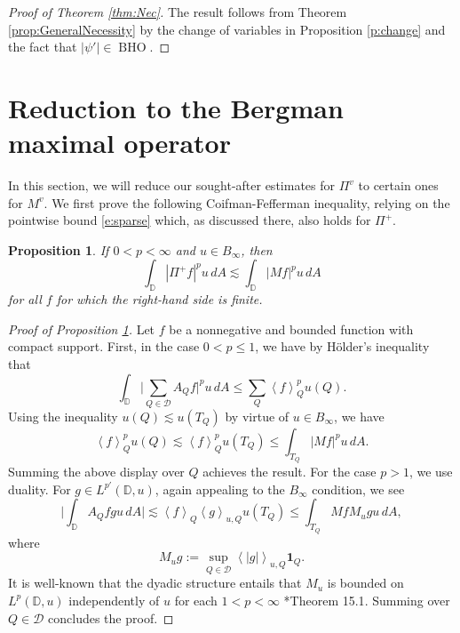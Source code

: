 \documentclass{amsart}
\newcommand{\abs}[1]{\left\vert {#1}\right\vert}
\newcommand{\avg}[1]{\left\langle {#1}\right\rangle}
\newtheorem{proposition}[theorem]{Proposition}
\theoremstyle{definition}
\numberwithin{equation}{section}
\newcommand{\Piv}{\Pi^v}
\newcommand{\Mv}{M^v}
\DeclareMathOperator{\BHO}{BHO}
\begin{document}
\begin{proof}[Proof of Theorem \ref{thm:Nec}]
The result follows from Theorem \ref{prop:GeneralNecessity} by the change of variables in Proposition \ref{p:change}
and the fact that $|\psi'| \in \BHO$. 
\end{proof}




\section{Reduction to the Bergman maximal operator}\label{s:Reduction}

In this section, we will reduce our sought-after estimates for $\Piv$ to certain ones for $\Mv$. We first prove the following Coifman-Fefferman inequality, relying on the pointwise bound \eqref{e:sparse} which, as discussed there, also holds for $\Pi^+$. 


\begin{proposition}\label{p:CF}
If $0<p<\infty$ and $u \in B_\infty$, then 
\[
    \int_{\mathbb{D}} |\Pi^+ f|^p u \, dA \lesssim \int_{\mathbb{D}} |Mf|^p u \, dA
\]
for all $f$ for which the right-hand side is finite.
\end{proposition}

\begin{proof}[Proof of Proposition \ref{p:CF}]
Let $f$ be a nonnegative and bounded function with compact support. First, in the case $0<p\leq 1$, we have by H\"older's inequality that
	\[ \int_{\mathbb D} \Big|\sum_{Q \in \mathcal D} A_Q f\Big|^p u \, dA \le \sum_Q \avg{f}_Q^p u(Q). \]
Using the inequality $u(Q) \lesssim u(T_Q)$ by virtue of $u \in B_\infty$, we have
	\[ \avg{f}_Q^p u(Q) \lesssim \avg{f}_Q^p u(T_Q) \le \int_{T_Q} \abs{Mf}^p u \, dA.\]
Summing the above display over $Q$ achieves the result. 
For the case $p>1$, we use duality. For $g \in L^{p'}(\mathbb{D},u)$, again appealing to the $B_{\infty}$ condition, we see
\[
\Big|\int_{\mathbb D} A_Q fg u \, dA \Big| \lesssim \avg{f}_Q \avg{g}_{u,Q} u(T_Q) \le \int_{T_Q} Mf M_ug u\, dA,
\]
where 
	\[ M_u g := \sup_{Q \in \mathcal D} \avg{|g|}_{u,Q} \mathbf 1_Q. \] 
It is well-known that the dyadic structure entails that $M_u$ is bounded on $L^p(\mathbb{D},u)$ independently of $u$ for each $1< p < \infty$ \cite{LN19}*{Theorem 15.1}. Summing over $Q \in \mathcal D$ concludes the proof.
\end{proof}
\end{document}
